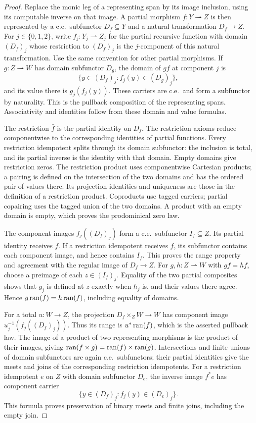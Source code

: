 \begin{proof}
Replace the monic leg of a representing span by its image
inclusion, using its computable inverse on that image. A partial
morphism $f:Y\rightharpoonup Z$ is then represented by a c.e.\ subfunctor
$D_f\subseteq Y$ and a natural transformation $D_f\to Z$.
For $j\in\{0,1,2\}$, write $f_j:Y_j\rightharpoonup Z_j$ for the
partial recursive function with domain $(D_f)_j$ whose restriction
to $(D_f)_j$ is the $j$-component of this natural transformation.
Use the same convention for other partial morphisms.
If $g:Z\rightharpoonup W$ has domain subfunctor $D_g$, the domain of $gf$
at component $j$ is
\[
 \{y\in(D_f)_j:f_j(y)\in(D_g)_j\},
\]
and its value there is $g_j(f_j(y))$. These carriers are c.e.\
and form a subfunctor by naturality. This is the
pullback composition of the representing spans. Associativity
and identities follow from these domain and value formulas.

The restriction $\bar f$ is the partial identity on $D_f$.
The restriction axioms reduce componentwise to the corresponding
identities of partial functions. Every restriction idempotent
splits through its domain subfunctor: the inclusion is total,
and its partial inverse is the identity with that domain.
Empty domains give restriction zeros. The restriction product
uses componentwise Cartesian products; a pairing is defined on
the intersection of the two domains and has the ordered pair
of values there. Its projection identities and uniqueness are
those in the definition of a restriction product. Coproducts
use tagged carriers; partial copairing uses the tagged union
of the two domains. A product with an empty domain is empty,
which proves the prodominical zero law.

The component images $f_j((D_f)_j)$ form a c.e.\ subfunctor
$I_f\subseteq Z$. Its partial identity receives $f$. If a restriction
idempotent receives $f$, its subfunctor contains each component image,
and hence contains $I_f$.
This proves the range property and agreement with the regular
image of $D_f\to Z$. For $g,h:Z\rightharpoonup W$ with
$gf=hf$, choose a preimage of each $z\in(I_f)_j$. Equality of the two partial composites shows
that $g_j$ is defined at $z$ exactly when $h_j$ is, and their
values there agree. Hence $g\operatorname{ran}(f)=h\operatorname{ran}(f)$, including
equality of domains.

For a total $u:W\to Z$, the projection
$D_f\times_Z W\to W$ has component image
$u_j^{-1}(f_j((D_f)_j))$. Thus its range is $u^*\operatorname{ran}(f)$,
which is the asserted pullback law. The image of a product
of two representing morphisms is the product of their images, giving
$\operatorname{ran}(f\times g)=\operatorname{ran}(f)\times\operatorname{ran}(g)$.
Intersections and finite unions of domain subfunctors are again
c.e.\ subfunctors; their partial identities give the meets and joins
of the corresponding restriction idempotents. For a restriction idempotent
$e$ on $Z$ with domain subfunctor $D_e$, the inverse image $f^*e$
has component carrier
\[
 \{y\in(D_f)_j:f_j(y)\in(D_e)_j\}.
\]
This formula proves preservation of binary meets and finite joins,
including the empty join.


\end{proof}
